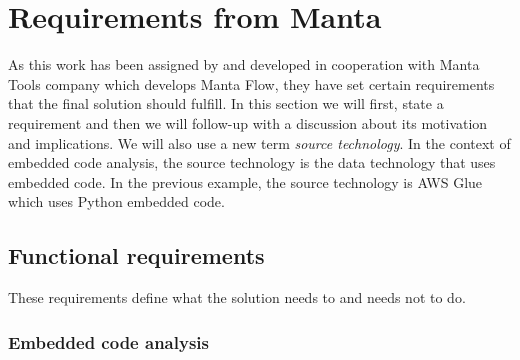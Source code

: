 \section{Requirements from Manta}

As this work has been assigned by and developed in cooperation with Manta Tools company which develops Manta Flow, they have set certain requirements that the final solution should fulfill. In this section we will first, state a requirement and then we will follow-up with a discussion about its motivation and implications. We will also use a new term \textit{source technology}. In the context of embedded code analysis, the source technology is the data technology that uses embedded code. In the previous example, the source technology is AWS Glue which uses Python embedded code.

\subsection{Functional requirements}

These requirements define what the solution needs to and needs not to do.

\subsubsection{Embedded code analysis}


